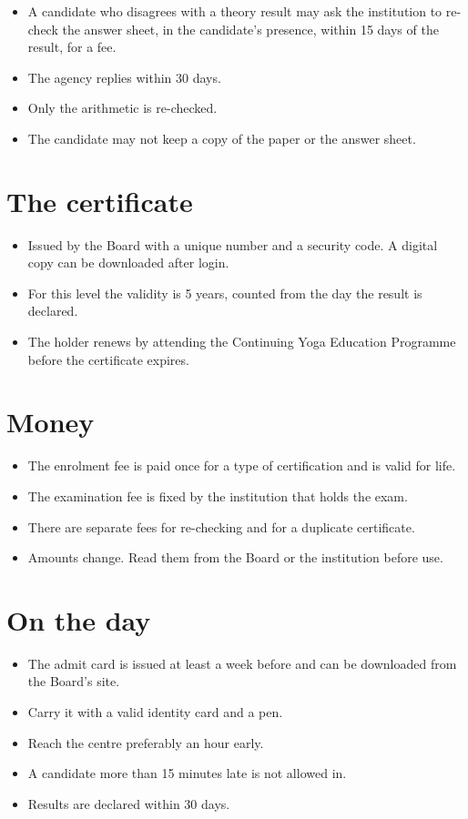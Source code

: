\begin{itemize}
\item A candidate who disagrees with a theory result may ask the institution to re-check the answer sheet, in the candidate's presence, within 15 days of the result, for a fee.
\item The agency replies within 30 days.
\item Only the arithmetic is re-checked.
\item The candidate may not keep a copy of the paper or the answer sheet.
\end{itemize}

\section*{The certificate}

\begin{itemize}
\item Issued by the Board with a unique number and a security code. A digital copy can be downloaded after login.
\item For this level the validity is 5 years, counted from the day the result is declared.
\item The holder renews by attending the Continuing Yoga Education Programme before the certificate expires.
\end{itemize}

\section*{Money}

\begin{itemize}
\item The enrolment fee is paid once for a type of certification and is valid for life.
\item The examination fee is fixed by the institution that holds the exam.
\item There are separate fees for re-checking and for a duplicate certificate.
\item Amounts change. Read them from the Board or the institution before use.
\end{itemize}

\section*{On the day}

\begin{itemize}
\item The admit card is issued at least a week before and can be downloaded from the Board's site.
\item Carry it with a valid identity card and a pen.
\item Reach the centre preferably an hour early.
\item A candidate more than 15 minutes late is not allowed in.
\item Results are declared within 30 days.
\end{itemize}

